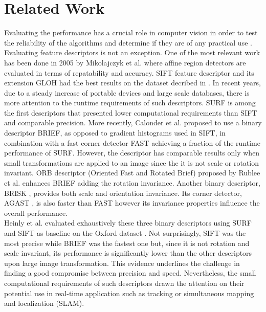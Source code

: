 \section{Related Work}
\label{sec:relatedwork}

Evaluating the performance has a crucial role in computer vision in order to test the reliability of the algorithms and determine if they are of any practical use \cite{christensen02,butler12,wu2013}. Evaluating feature descriptors is not an exception. One of the most relevant work has been done in 2005 by Mikolajczyk et al. \cite{mikolajczyk05} where affine region detectors are evaluated in terms of repatability and accuracy. SIFT feature descriptor \cite{lowe04} and its extension GLOH \cite{mikolajczyk05} had the best results on the dataset decribed in \cite{mikolajczyk2005b}. In recent years, due to a steady increase of portable devices and large scale databases, there is more attention to the runtime requirements of such descriptors. SURF \cite{bay2008} is among the first descriptors that presented lower computational requirements than SIFT and comparable precision. More recently, Calonder et al. \cite{calonder10} proposed to use a binary descriptor BRIEF, as opposed to gradient histograms used in SIFT, in combination with a fast corner detector FAST \cite{rosten06} achieving a fraction of the runtime performance of SURF. However, the descriptor has comparable results only when small transformations are applied to an image since the it is not scale or rotation invariant. ORB descriptor (Oriented Fast and Rotated Brief) proposed by Rublee et al. \cite{rublee11} enhances BRIEF adding the rotation invariance. Another binary descriptor, BRISK \cite{leutenegger11}, provides both scale and orientation invariance. Its corner detector, AGAST \cite{mair2010} , is also faster than FAST however its invariance properties influence the overall performance.\\ 
Heinly et al. \cite{heinly2012} evaluated exhaustively these three binary descriptors using SURF and SIFT as baseline on the Oxford dataset \cite{mikolajczyk2005b}. Not surprisingly, SIFT was the most precise while BRIEF was the fastest one but, since it is not rotation and scale invariant, its performance is significantly lower than the other descriptors upon large image transformation. This evidence underlines the challenge in finding a good compromise between precision and speed. Nevertheless, the small computational requirements of such descriptors drawn the attention on their potential use in real-time application such as tracking or simultaneous mapping and localization (SLAM). \\

